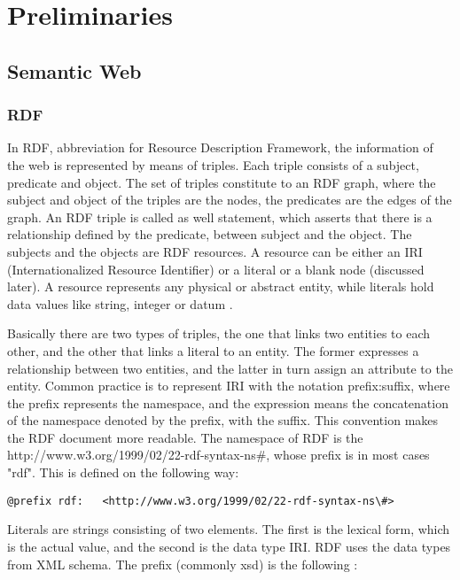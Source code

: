\chapter{Preliminaries}

\section{Semantic Web}

\subsection{RDF}

In RDF, abbreviation for Resource Description Framework, the information of the web is represented by means of triples. Each triple consists of a subject, predicate and object. The set of triples constitute to an RDF graph, where the subject and object of the triples are the nodes, the predicates are the edges of the graph.
An RDF triple is called as well statement, which asserts that there is a relationship defined by the predicate, between subject and the object. The subjects and the objects are RDF resources. A resource can be either an IRI (Internationalized Resource Identifier) or a literal or a blank node (discussed later). A resource represents any physical or abstract entity, while literals hold data values like string, integer or datum \cite{Lanthaler:14:RCA}.

Basically there are two types of triples, the one that links two entities to each other, and the other that links a literal to an entity. The former expresses a relationship between two entities, and the latter in turn assign an attribute to the entity.
Common practice is to represent IRI with the notation prefix:suffix, where the prefix represents the namespace, and the expression means the concatenation of the namespace denoted by the prefix, with the suffix. This convention makes the RDF document more readable. The namespace of RDF is the http://www.w3.org/1999/02/22-rdf-syntax-ns\#, whose prefix is in most cases "rdf".   This is defined on the following way:
\begin{lstlisting}[basicstyle=\footnotesize, captionpos=b, caption=Prefix notation in RDF, label=lst:sparql,
frame=single]
 @prefix rdf:   <http://www.w3.org/1999/02/22-rdf-syntax-ns\#>
\end{lstlisting}

Literals are strings consisting of two elements. The first is the lexical form, which is the actual value, and the second is the data type IRI.  RDF uses the data types from XML schema. The prefix (commonly xsd) is the following :

